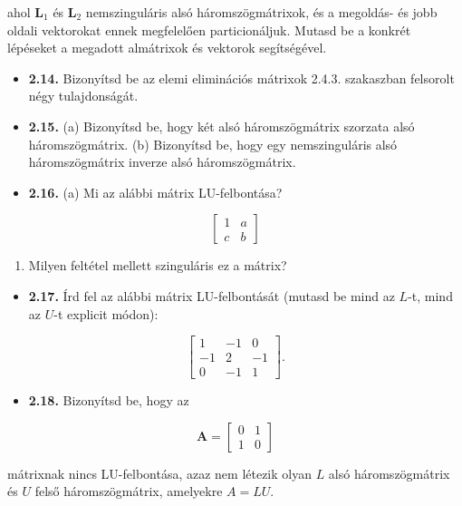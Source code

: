 \documentclass[
  magyar,
  11pt]{article}
\providecommand{\tightlist}{%
  \setlength{\itemsep}{0pt}\setlength{\parskip}{0pt}}
\providecommand{\boldsymbol}[1]{\mathbf{#1}}
\begin{document}
ahol \(\boldsymbol{L}_1\) és \(\boldsymbol{L}_2\) nemszinguláris alsó
háromszögmátrixok, és a megoldás- és jobb oldali vektorokat ennek
megfelelően particionáljuk. Mutasd be a konkrét lépéseket a megadott
almátrixok és vektorok segítségével.

\begin{itemize}
\tightlist
\item
  \textbf{2.14.} Bizonyítsd be az elemi eliminációs mátrixok 2.4.3.
  szakaszban felsorolt négy tulajdonságát.
\item
  \textbf{2.15.} (a) Bizonyítsd be, hogy két alsó háromszögmátrix
  szorzata alsó háromszögmátrix. (b) Bizonyítsd be, hogy egy
  nemszinguláris alsó háromszögmátrix inverze alsó háromszögmátrix.
\item
  \textbf{2.16.} (a) Mi az alábbi mátrix LU-felbontása?
\end{itemize}

\[\begin{bmatrix} 1 & a \\ c & b \end{bmatrix}\]

\begin{enumerate}
\def\labelenumi{(\alph{enumi})}
\setcounter{enumi}{1}
\tightlist
\item
  Milyen feltétel mellett szinguláris ez a mátrix?
\end{enumerate}

\begin{itemize}
\tightlist
\item
  \textbf{2.17.} Írd fel az alábbi mátrix LU-felbontását (mutasd be mind
  az \(L\)-t, mind az \(U\)-t explicit módon):
\end{itemize}

\[\begin{bmatrix} 1 & -1 & 0 \\ -1 & 2 & -1 \\ 0 & -1 & 1 \end{bmatrix}.\]

\begin{itemize}
\tightlist
\item
  \textbf{2.18.} Bizonyítsd be, hogy az
\end{itemize}

\[\mathbf{A} = \begin{bmatrix} 0 & 1 \\ 1 & 0 \end{bmatrix}\]

mátrixnak nincs LU-felbontása, azaz nem létezik olyan \(L\) alsó
háromszögmátrix és \(U\) felső háromszögmátrix, amelyekre \(A = LU\).
\end{document}
